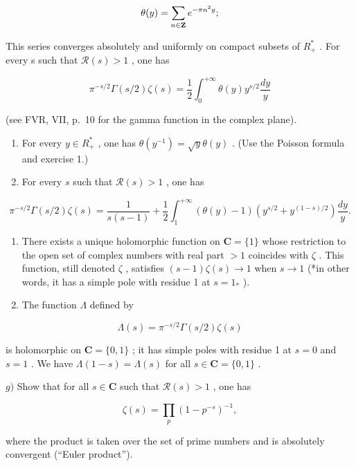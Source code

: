 \[
\theta (y) = \sum_ {n \in {\bf Z}} e ^ {- \pi n ^ {2} y};
\]

This series converges absolutely and uniformly on compact subsets of \(R_{+}^{*}\) . For every s such that \(\mathcal{R}(s)>1\) , one has

\[
\pi^ {- s / 2} \Gamma (s / 2) \zeta (s) = \frac {1}{2} \int_ {0} ^ {+ \infty} \theta (y) y ^ {s / 2} \frac {d y}{y}
\]

(see FVR, VII, p.~10 for the gamma function in the complex plane).

\begin{enumerate}
\def\labelenumi{\alph{enumi})}
\setcounter{enumi}{2}
\item
  For every \(y \in R_{+}^{*}\) , one has \(\theta(y^{-1}) = \sqrt{y}\theta(y)\) . (Use the Poisson formula and exercise 1.)
\item
  For every \(s\) such that \(\mathcal{R}(s) > 1\) , one has
\end{enumerate}

\[
\pi^ {- s / 2} \Gamma (s / 2) \zeta (s) = \frac {1}{s (s - 1)} + \frac {1}{2} \int_ {1} ^ {+ \infty} (\theta (y) - 1) (y ^ {s / 2} + y ^ {(1 - s) / 2}) \frac {d y}{y}.
\]

\begin{enumerate}
\def\labelenumi{\alph{enumi})}
\setcounter{enumi}{4}
\item
  There exists a unique holomorphic function on \(\mathbf{C} = \{1\}\) whose restriction to the open set of complex numbers with real part \(>1\) coincides with \(\zeta\) . This function, still denoted \(\zeta\) , satisfies \((s - 1)\zeta(s) \to 1\) when \(s \to 1\) (*in other words, it has a simple pole with residue 1 at \(s = 1_*\) ).
\item
  The function \(\Lambda\) defined by
\end{enumerate}

\[
\Lambda (s) = \pi^ {- s / 2} \Gamma (s / 2) \zeta (s)
\]

is holomorphic on \(\mathbf{C} = \{0,1\}\) ; it has simple poles with residue 1 at \(s = 0\) and \(s = 1\) . We have \(\Lambda(1 - s) = \Lambda(s)\) for all \(s \in \mathbf{C} = \{0,1\}\) .

\(g)\) Show that for all \(s \in \mathbf{C}\) such that \(\mathcal{R}(s) > 1\) , one has

\[
\zeta (s) = \prod_ {p} (1 - p ^ {- s}) ^ {- 1},
\]

where the product is taken over the set of prime numbers and is absolutely convergent (“Euler product”).

